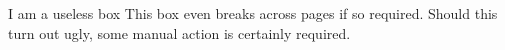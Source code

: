 \begin{example}[%
        label={ex:example},%
    ]{%
        I am a useless box%
    }
    This box even breaks across pages if so required.
    Should this turn out ugly, some manual action is certainly required.
\end{example}
